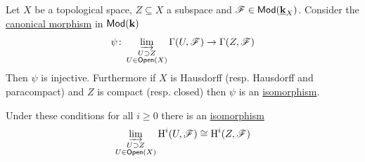 \documentclass[../../main]{subfiles}
\begin{document}
\begin{lemma}\label{lemma:cohomology-compact-subsets}
  Let \(X\) be a topological space, \(Z \subseteq X\) a subspace and \(\mathscr{F} \in \mathsf{Mod}(\underline{\mathbf{k}}_{X})\).
  Consider the \hyperref[def:inverse-limit]{canonical morphism} in \(\mathsf{Mod}(\mathbf{k})\)
  \begin{equation*}
    \psi\colon \varinjlim_{\substack{U \supset Z \\ U \in \mathsf{Open}(X)}} \Gamma(U, \mathscr{F}) \to \Gamma(Z, \mathscr{F})
  \end{equation*}
  Then \(\psi\) is injective.
  Furthermore if \(X\) is Hausdorff (resp. Hausdorff and paracompact) and \(Z\) is compact (resp. closed) then \(\psi\) is an \hyperref[def:categorical-isomorphism]{isomorphism}.
  
  Under these conditions for all \(i \geq 0\) there is an \hyperref[def:categorical-isomorphism]{isomorphism}
  \begin{equation*}
    \varinjlim_{\substack{U \supset Z \\ U \in \mathsf{Open}(X)}}  \operatorname{H}^{i}(U, \mathscr{F}) \cong \operatorname{H}^{i}(Z, \mathscr{F})
  \end{equation*}
\end{lemma}
\end{document}
